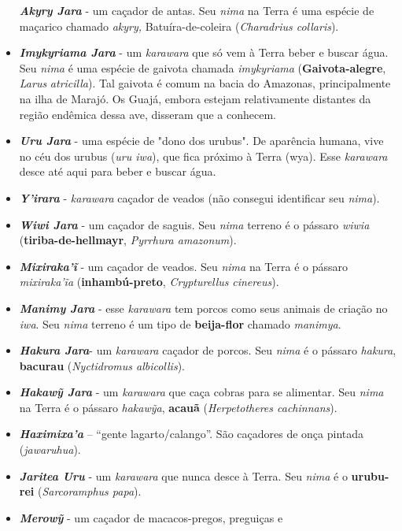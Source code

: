 \begin{itemize}
  \textbf{\emph{Akyry Jara}} - um caçador de antas. Seu \emph{nima} na
  Terra é uma espécie de maçarico chamado \emph{akyry,}
  Batuíra-de-coleira (\emph{Charadrius collaris}).
\item
  \emph{\textbf{Imykyriama Jara}} - um \emph{karawara} que só vem à
  Terra beber e buscar água. Seu \emph{nima} é uma espécie de gaivota
  chamada \emph{imykyriama} (\textbf{Gaivota-alegre}, \emph{Larus}
  \emph{atricilla}). Tal gaivota é comum na bacia do Amazonas,
  principalmente na ilha de Marajó. Os Guajá, embora estejam
  relativamente distantes da região endêmica dessa ave, disseram que a
  conhecem.
\item
  \emph{\textbf{Uru Jara}} - uma espécie de "dono dos urubus". De
  aparência humana, vive no céu dos urubus (\emph{uru iwa}), que fica
  próximo à Terra (wya). Esse \emph{karawara} desce até aqui para beber
  e buscar água.
\item
  \emph{\textbf{Y'irara}} - \emph{karawara} caçador de veados (não
  consegui identificar seu \emph{nima}).
\item
  \emph{\textbf{Wiwi Jara}} - um caçador de saguis. Seu \emph{nima}
  terreno é o pássaro \emph{wiwia} (\textbf{tiriba-de-hellmayr},
  \emph{Pyrrhura amazonum}).
\item
  \emph{\textbf{Mixiraka'ĩ}} - um caçador de veados. Seu \emph{nima} na
  Terra é o pássaro \emph{mixiraka'ĩa} (\textbf{inhambú-preto},
  \emph{Crypturellus} \emph{cinereus}).
\item
  \emph{\textbf{Manimy Jara}} - esse \emph{karawara} tem porcos como
  seus animais de criação no \emph{iwa}. Seu \emph{nima} terreno é um
  tipo de \textbf{beija-flor} chamado \emph{manimya}.
\item
  \emph{\textbf{Hakura Jara}}- um \emph{karawara} caçador de porcos. Seu
  \emph{nima} é o pássaro \emph{hakura}, \textbf{bacurau}
  (\emph{Nyctidromus albicollis}).
\item
  \emph{\textbf{Hakawỹ Jara}} - um \emph{karawara} que caça cobras para
  se alimentar. Seu \emph{nima} na Terra é o pássaro \emph{hakawỹa},
  \textbf{acauã} (\emph{Herpetotheres cachinnans}).
\item
  \emph{\textbf{Haximixa'a}} -- ``gente lagarto/calango''. São caçadores
  de onça pintada (\emph{jawaruhua}).
\item
  \emph{\textbf{Jaritea Uru}} - um \emph{karawara} que nunca desce à
  Terra. Seu \emph{nima} é o \textbf{urubu-rei} (\emph{Sarcoramphus
  papa}).
\item
  \emph{\textbf{Merowỹ}} - um caçador de macacos-pregos, preguiças e

\end{itemize}
